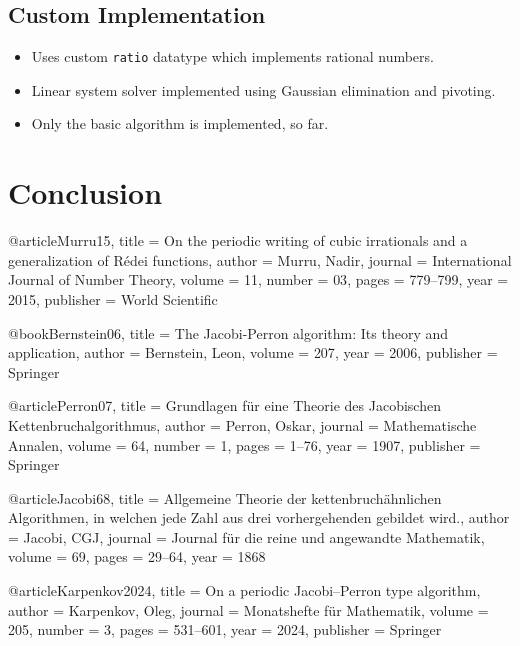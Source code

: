 \documentclass[english,version-2020-11]{uzl-thesis}
\begin{document}
\section{Custom Implementation}

\begin{itemize}
  \item Uses custom \texttt{ratio} datatype which implements rational numbers.
  \item Linear system solver implemented using Gaussian elimination and pivoting.
  \item Only the basic algorithm is implemented, so far.
\end{itemize}


\chapter{Conclusion}


\begin{bibtex-entries}
@article{Murru15,
  title     = {On the periodic writing of cubic irrationals and a generalization of R{\'e}dei functions},
  author    = {Murru, Nadir},
  journal   = {International Journal of Number Theory},
  volume    = {11},
  number    = {03},
  pages     = {779--799},
  year      = {2015},
  publisher = {World Scientific}
}

@book{Bernstein06,
  title     = {The Jacobi-Perron algorithm: Its theory and application},
  author    = {Bernstein, Leon},
  volume    = {207},
  year      = {2006},
  publisher = {Springer}
}

@article{Perron07,
  title     = {Grundlagen f{\"u}r eine Theorie des Jacobischen Kettenbruchalgorithmus},
  author    = {Perron, Oskar},
  journal   = {Mathematische Annalen},
  volume    = {64},
  number    = {1},
  pages     = {1--76},
  year      = {1907},
  publisher = {Springer}
}

@article{Jacobi68,
  title   = {Allgemeine Theorie der kettenbruch{\"a}hnlichen Algorithmen, in welchen jede Zahl aus drei vorhergehenden gebildet wird.},
  author  = {Jacobi, CGJ},
  journal = {Journal f{\"u}r die reine und angewandte Mathematik},
  volume  = {69},
  pages   = {29--64},
  year    = {1868}
}

@article{Karpenkov2024,
  title     = {On a periodic Jacobi--Perron type algorithm},
  author    = {Karpenkov, Oleg},
  journal   = {Monatshefte f{\"u}r Mathematik},
  volume    = {205},
  number    = {3},
  pages     = {531--601},
  year      = {2024},
  publisher = {Springer}
}
\end{bibtex-entries}
\end{document}
